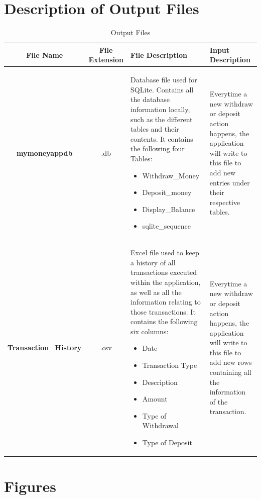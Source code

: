 \documentclass[12pt]{article}
\begin{document}
\section{Description of Output Files}

\begin{table}[H]
\caption{Output Files}
\begin{center}
\begin{tabular}{|c|c|p{4.5cm}|p{4cm}|}
\hline
  \bf File Name & \bf File Extension & \bf File Description & \bf Input Description \\\hline
	\bf mymoneyappdb &
		.db &
Database file used for SQLite. Contains all the database information locally, such as the different tables and their contents. It contains the following four Tables: 
\begin{itemize} 
	\item Withdraw\_Money
	\item Deposit\_money
	\item Display\_Balance
	\item sqlite\_sequence
\end{itemize}
		& Everytime a new withdraw or deposit action happens, the application will write to this file to add new entries under their respective tables.   \\
		\hline
		\bf Transaction\_History	&
		.csv 	&
Excel file used to keep a history of all transactions executed within the application, as well as all the information relating to those transactions. It contains the following six columns:
		\begin{itemize} 
		\item Date
		\item Transaction Type
		\item Description
		\item Amount
		\item Type of Withdrawal
		\item Type of Deposit
		\end{itemize}
	& Everytime a new withdraw or deposit action happens, the application will write to this file to add new rows containing all the information of the transaction.\\\hline
\end{tabular}
\end{center}
\end{table}


\clearpage 
\section{Figures}
\end{document}
